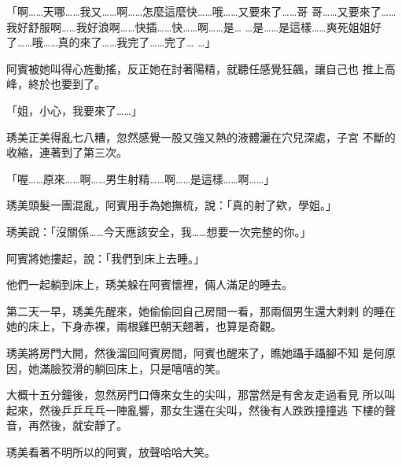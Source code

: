 「啊……天哪……我又……啊……怎麼這麼快……哦……又要來了……哥
哥……又要來了……我好舒服啊……我好浪啊……快插……快……啊……是…
…是……是這樣……爽死姐姐好了……哦……真的來了……我完了……完了…
…」

阿賓被她叫得心旌動搖，反正她在討著陽精，就聽任感覺狂飆，讓自己也
推上高峰，終於也要到了。

「姐，小心，我要來了……」

琇美正美得亂七八糟，忽然感覺一股又強又熱的液體灑在穴兒深處，子宮
不斷的收縮，連著到了第三次。

「喔……原來……啊……男生射精……啊……是這樣……啊……」

琇美頭髮一團混亂，阿賓用手為她撫梳，說：「真的射了欸，學姐。」

琇美說：「沒關係……今天應該安全，我……想要一次完整的你。」

阿賓將她摟起，說：「我們到床上去睡。」

他們一起躺到床上，琇美躲在阿賓懷裡，倆人滿足的睡去。

第二天一早，琇美先醒來，她偷偷回自己房間一看，那兩個男生還大剌剌
的睡在她的床上，下身赤裸，兩根雞巴朝天翹著，也算是奇觀。

琇美將房門大開，然後溜回阿賓房間，阿賓也醒來了，瞧她躡手躡腳不知
是何原因，她滿臉狡滑的躺回床上，只是嘻嘻的笑。

大概十五分鐘後，忽然房門口傳來女生的尖叫，那當然是有舍友走過看見
所以叫起來，然後乒乒乓乓一陣亂響，那女生還在尖叫，然後有人跌跌撞撞逃
下樓的聲音，再然後，就安靜了。

琇美看著不明所以的阿賓，放聲哈哈大笑。










